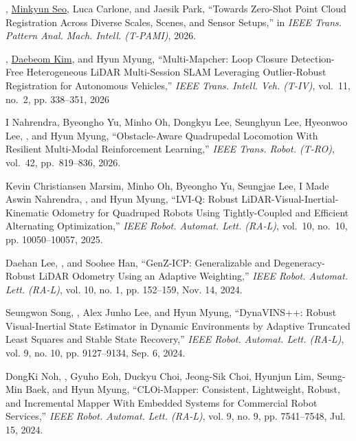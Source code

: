 \begin{pubSubsectionNum}
    \item \underline{\hyungtaelim}, \underline{Minkyun Seo}, Luca Carlone, and Jaesik Park, ``Towards Zero-Shot Point Cloud Registration Across Diverse Scales, Scenes, and Sensor Setups,'' in \textit{IEEE Trans. Pattern Anal. Mach. Intell. (T-PAMI)}, 2026. \underreview
    \item \underline{\hyungtaelim}, \underline{Daebeom Kim}, and Hyun Myung, ``Multi-Mapcher: Loop Closure Detection-Free Heterogeneous LiDAR Multi-Session SLAM Leveraging Outlier-Robust Registration for Autonomous Vehicles,'' \textit{IEEE Trans. Intell. Veh. (T-IV)}, vol.~11, no.~2, pp. 338--351, 2026
    \item I Nahrendra, Byeongho Yu, Minho Oh, Dongkyu Lee, Seunghyun Lee, Hyeonwoo Lee, \hyungtaelim, and Hyun Myung, ``Obstacle-Aware Quadrupedal Locomotion With Resilient Multi-Modal Reinforcement Learning,'' \textit{IEEE Trans. Robot. (T-RO)}, vol.~42, pp.~819--836, 2026.
    \item Kevin Christiansen Marsim, Minho Oh, Byeongho Yu, Seungjae Lee, I Made Aswin Nahrendra, \hyungtaelim, and Hyun Myung, ``LVI-Q: Robust LiDAR-Visual-Inertial-Kinematic Odometry for Quadruped Robots Using Tightly-Coupled and Efficient Alternating Optimization,'' \textit{IEEE Robot. Automat. Lett. (RA-L)}, vol.~10, no.~10, pp. 10050--10057, 2025. 
    \item Daehan Lee, \hyungtaelim, and Soohee Han, ``GenZ-ICP: Generalizable and Degeneracy-Robust LiDAR Odometry Using an Adaptive Weighting,'' \textit{IEEE Robot. Automat. Lett. (RA-L)}, vol. 10, no. 1, pp. 152--159, Nov. 14, 2024.
    \item Seungwon Song, \hyungtaelim, Alex Junho Lee, and Hyun Myung, ``DynaVINS++: Robust Visual-Inertial State Estimator in Dynamic Environments by Adaptive Truncated Least Squares and Stable State Recovery,'' \textit{IEEE Robot. Automat. Lett. (RA-L)}, vol. 9, no. 10, pp. 9127--9134, Sep. 6, 2024.
    \item {DongKi Noh, \hyungtaelim, Gyuho Eoh, Duckyu Choi, Jeong-Sik Choi, Hyunjun Lim, Seung-Min Baek, and Hyun Myung, ``CLOi-Mapper: Consistent, Lightweight, Robust, and Incremental Mapper With Embedded Systems for Commercial Robot Services,'' \textit{IEEE Robot. Automat. Lett. (RA-L)}, vol. 9, no. 9, pp. 7541--7548, Jul. 15, 2024}.

\end{pubSubsectionNum}
